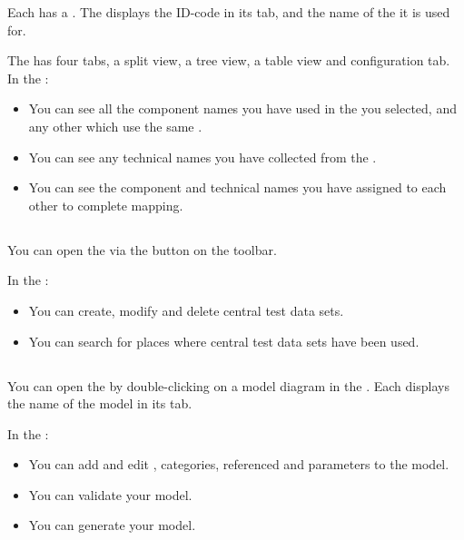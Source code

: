 Each \gdaut{} has a \gdomeditor{}. The \gdomeditor{} displays the ID-code  in its tab, and the name of the \gdaut{} it is used for. 

The \gdomeditor{} has four tabs, a split view, a tree view, a table view and configuration tab. 
In the \gdomeditor{}:
\begin{itemize}
\item You can see all the component names you have used in the \gdsuite{} you selected, and any other \gdsuites{} which use the same \gdaut{}. 
\item You can see any technical names you have collected from the \gdaut{}. 
\item You can see the component and technical names you have assigned to each other to complete mapping. 
\end{itemize}

\subsection{\gddataeditor{}}

You can open the \gddataeditor{} via the button on the toolbar. 

In the \gddataeditor{}:
\begin{itemize}
\item You can create, modify and delete central test data sets. 
\item You can search for places where central test data sets have been used. 
\end{itemize}


\subsection{\gdmodeleditor{}}

You can open the \gdmodeleditor{} by double-clicking on a model diagram in the \gdnavview{}. 
Each \gdmodeleditor{} displays the name of the model in its tab.  
 
In the \gdmodeleditor{}:
\begin{itemize}
\item You can add and edit \gdcases{}, categories, referenced \gdcases{} and parameters to the model. 
\item You can validate your model. 
\item You can generate your model. 
\end{itemize}

